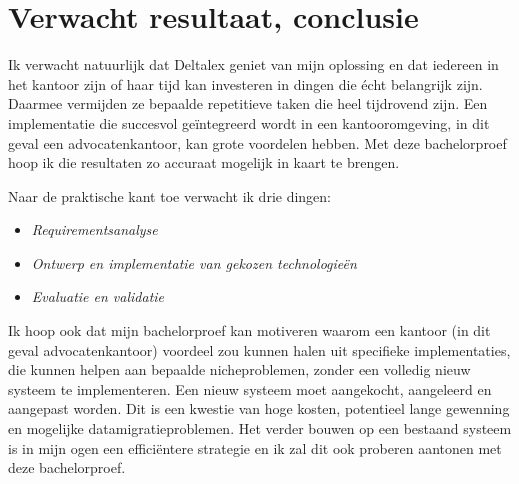 \section{Verwacht resultaat, conclusie}%
\label{sec:verwachte_resultaten}
Ik verwacht natuurlijk dat Deltalex geniet van mijn oplossing en dat iedereen in het kantoor zijn of haar tijd kan investeren 
in dingen die écht belangrijk zijn. Daarmee vermijden ze bepaalde repetitieve taken die heel tijdrovend zijn.
Een implementatie die succesvol geïntegreerd wordt in een kantooromgeving, in dit geval een advocatenkantoor, 
kan grote voordelen hebben. Met deze bachelorproef hoop ik die resultaten zo accuraat mogelijk in kaart te brengen.

Naar de praktische kant toe verwacht ik drie dingen:
\begin{itemize}
	\item \emph{Requirementsanalyse}
	\item \emph{Ontwerp en implementatie van gekozen technologieën}
	\item \emph{Evaluatie en validatie}
\end{itemize}

Ik hoop ook dat mijn bachelorproef kan motiveren waarom een kantoor (in dit geval advocatenkantoor) voordeel zou kunnen 
halen uit specifieke implementaties, die kunnen helpen aan bepaalde nicheproblemen, zonder een volledig nieuw systeem 
te implementeren. Een nieuw systeem moet aangekocht, aangeleerd en aangepast worden. 
Dit is een kwestie van hoge kosten, potentieel lange gewenning en mogelijke datamigratieproblemen. 
Het verder bouwen op een bestaand systeem is in mijn ogen een efficiëntere strategie en ik zal dit ook proberen aantonen 
met deze bachelorproef.
